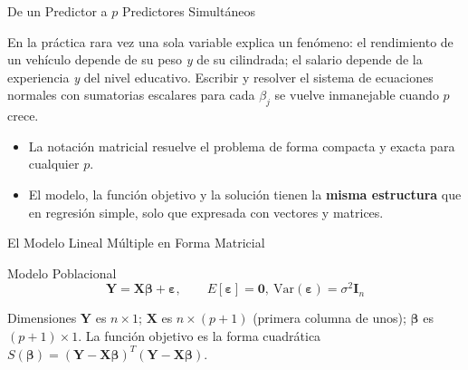 \documentclass[10pt, aspectratio=169]{beamer}
\begin{document}
\begin{frame}{De un Predictor a $p$ Predictores Simultáneos}
  \footnotesize
  \begin{motivacion}
    En la práctica rara vez una sola variable explica un fenómeno: el rendimiento de un vehículo depende de su peso \emph{y} de su cilindrada; el salario depende de la experiencia \emph{y} del nivel educativo. Escribir y resolver el sistema de ecuaciones normales con sumatorias escalares para cada $\beta_j$ se vuelve inmanejable cuando $p$ crece.
  \end{motivacion}

  \vspace{0.15cm}
  \pause
  \begin{itemize}\itemsep=0.1cm
    \item La notación matricial resuelve el problema de forma compacta y exacta para cualquier $p$. \pause
    \item El modelo, la función objetivo y la solución tienen la \textbf{misma estructura} que en regresión simple, solo que expresada con vectores y matrices.
  \end{itemize}
\end{frame}

\begin{frame}{El Modelo Lineal Múltiple en Forma Matricial}
  \footnotesize
  \begin{block}{Modelo Poblacional}
    $$\mathbf{Y}=\mathbf{X}\boldsymbol\beta+\boldsymbol\varepsilon, \qquad E[\boldsymbol\varepsilon]=\mathbf{0},\ \text{Var}(\boldsymbol\varepsilon)=\sigma^2\mathbf{I}_n$$
  \end{block}
  \pause

  \vspace{0.1cm}
  \begin{alertblock}{Dimensiones}
    $\mathbf{Y}$ es $n\times1$; $\mathbf{X}$ es $n\times(p+1)$ (primera columna de unos); $\boldsymbol\beta$ es $(p+1)\times1$. La función objetivo es la forma cuadrática $S(\boldsymbol\beta)=(\mathbf{Y}-\mathbf{X}\boldsymbol\beta)^T(\mathbf{Y}-\mathbf{X}\boldsymbol\beta)$.
  \end{alertblock}
\end{frame}
\end{document}
